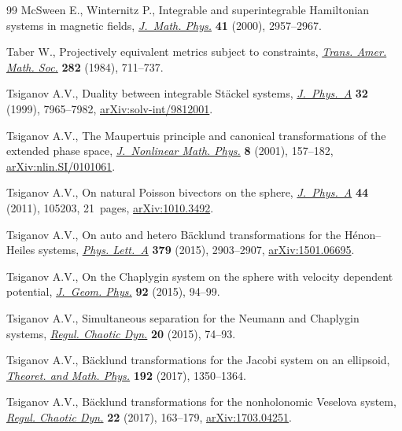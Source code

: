 \begin{thebibliography}{99}
McSween E., Winternitz P., Integrable and superintegrable {H}amiltonian systems
  in magnetic fields, \href{https://doi.org/10.1063/1.533283}{\textit{J.~Math. Phys.}} \textbf{41} (2000), 2957--2967.

Taber W., Projectively equivalent metrics subject to constraints,
  \href{https://doi.org/10.2307/1999261}{\textit{Trans. Amer. Math. Soc.}} \textbf{282} (1984), 711--737.

Tsiganov A.V., Duality between integrable {S}t\"ackel systems,
  \href{https://doi.org/10.1088/0305-4470/32/45/311}{\textit{J.~Phys.~A}} \textbf{32} (1999), 7965--7982,
  \href{https://arxiv.org/abs/solv-int/9812001}{arXiv:solv-int/9812001}.

Tsiganov A.V., The {M}aupertuis principle and canonical transformations of the
  extended phase space, \href{https://doi.org/10.2991/jnmp.2001.8.1.12}{\textit{J.~Nonlinear Math. Phys.}} \textbf{8} (2001),
  157--182, \href{https://arxiv.org/abs/nlin.SI/0101061}{arXiv:nlin.SI/0101061}.

Tsiganov A.V., On natural {P}oisson bivectors on the sphere,
  \href{https://doi.org/10.1088/1751-8113/44/10/105203}{\textit{J.~Phys.~A}} \textbf{44} (2011), 105203, 21~pages, \href{https://arxiv.org/abs/1010.3492}{arXiv:1010.3492}.

Tsiganov A.V., On auto and hetero {B}\"acklund transformations for the
  {H}\'{e}non--{H}eiles systems, \href{https://doi.org/10.1016/j.physleta.2015.08.023}{\textit{Phys. Lett.~A}} \textbf{379} (2015),
  2903--2907, \href{https://arxiv.org/abs/1501.06695}{arXiv:1501.06695}.

Tsiganov A.V., On the {C}haplygin system on the sphere with velocity dependent
  potential, \href{https://doi.org/10.1016/j.geomphys.2015.02.006}{\textit{J.~Geom. Phys.}} \textbf{92} (2015), 94--99.

Tsiganov A.V., Simultaneous separation for the {N}eumann and {C}haplygin
  systems, \href{https://doi.org/10.1134/S1560354715010062}{\textit{Regul. Chaotic Dyn.}} \textbf{20} (2015), 74--93.

Tsiganov A.V., B\"acklund transformations for the {J}acobi system on an
  ellipsoid, \href{https://doi.org/10.1134/S0040577917090069}{\textit{Theoret. and Math. Phys.}} \textbf{192} (2017), 1350--1364.

Tsiganov A.V., B\"acklund transformations for the nonholonomic {V}eselova
  system, \href{https://doi.org/10.1134/S1560354717020058}{\textit{Regul. Chaotic Dyn.}} \textbf{22} (2017), 163--179,
  \href{https://arxiv.org/abs/1703.04251}{arXiv:1703.04251}.


\end{thebibliography}
